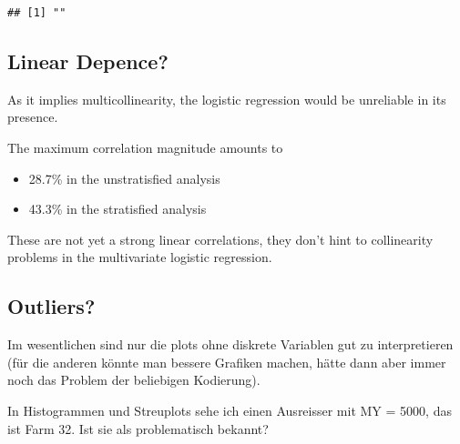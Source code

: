 \documentclass[
]{article}
\providecommand{\tightlist}{%
  \setlength{\itemsep}{0pt}\setlength{\parskip}{0pt}}
\begin{document}
\begin{verbatim}
## [1] ""
\end{verbatim}

\hypertarget{linear-depence}{%
\subsection{Linear Depence?}\label{linear-depence}}

As it implies multicollinearity, the logistic regression would be
unreliable in its presence.

The maximum correlation magnitude amounts to

\begin{itemize}
\tightlist
\item
  28.7\% in the unstratisfied analysis
\item
  43.3\% in the stratisfied analysis
\end{itemize}

These are not yet a strong linear correlations, they don't hint to
collinearity problems in the multivariate logistic regression.

\hypertarget{outliers}{%
\subsection{Outliers?}\label{outliers}}

Im wesentlichen sind nur die plots ohne diskrete Variablen gut zu
interpretieren (für die anderen könnte man bessere Grafiken machen,
hätte dann aber immer noch das Problem der beliebigen Kodierung).

In Histogrammen und Streuplots sehe ich einen Ausreisser mit MY = 5000,
das ist Farm 32. Ist sie als problematisch bekannt?
\end{document}

